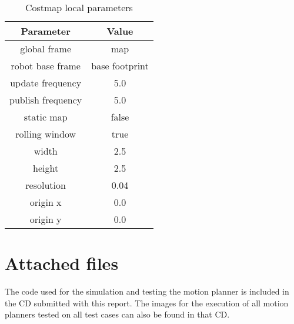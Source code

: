 \begin{table}[H]
    \centering
    \begin{tabular}{cc}
    \textbf{Parameter} & \textbf{Value} \\\toprule
    global frame & map\\
    robot base frame & base footprint\\
    update frequency & 5.0\\
    publish frequency & 5.0\\
    static map & false\\
    rolling window & true\\
    width & 2.5\\
    height & 2.5\\
    resolution & 0.04\\
    origin x & 0.0\\
    origin y & 0.0\\
    \end{tabular}
    \caption{Costmap local parameters}\label{tab:costmap_local}
\end{table}


\chapter{Attached files}
\label{attached_files}

The code used for the simulation and testing the motion planner is included in the CD submitted with
this report. The images for the execution of all motion planners tested on all test cases can also 
be found in that CD\@.
